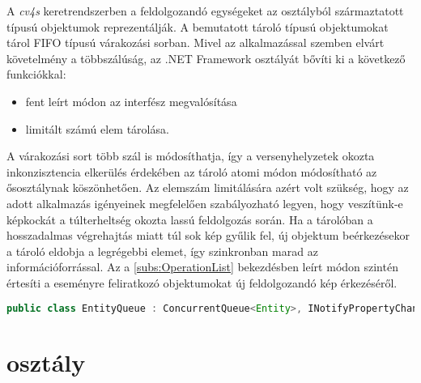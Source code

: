 A \emph{cv4s} keretrendszerben a feldolgozandó egységeket az  osztályból származtatott típusú objektumok reprezentálják. A bemutatott tároló  típusú objektumokat tárol FIFO típusú várakozási sorban. Mivel az alkalmazással szemben elvárt követelmény a többszálúság, az  .NET Framework  osztályát bővíti ki a következő funkciókkal:
\begin{itemize}
\item fent leírt módon az  interfész megvalósítása
\item limitált számú elem tárolása.
\end{itemize}
A várakozási sort több szál is módosíthatja, így a versenyhelyzetek okozta inkonzisztencia elkerülés érdekében az tároló atomi módon módosítható az ősosztálynak köszönhetően. Az elemszám limitálására azért volt szükség, hogy az adott alkalmazás igényeinek megfelelően szabályozható legyen, hogy veszítünk-e képkockát a túlterheltség okozta lassú feldolgozás során. Ha a tárolóban a hosszadalmas végrehajtás miatt túl sok kép gyűlik fel, új objektum beérkezésekor a tároló eldobja a legrégebbi elemet, így szinkronban marad az információforrással. Az  a \ref{subs:OperationList} bekezdésben leírt módon szintén értesíti a  eseményre feliratkozó objektumokat új feldolgozandó kép érkezéséről.

\begin{mdframed}[backgroundcolor=gray!20]
\begin{small}
\begin{scriptsize}
\begin{lstlisting}[language=java]
public class EntityQueue : ConcurrentQueue<Entity>, INotifyPropertyChanged
\end{lstlisting}
\end{scriptsize}
\end{small}
\end{mdframed}

\section{ osztály} \label{section:CameraReader}


